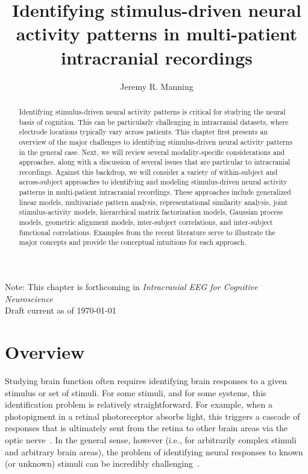 \documentclass{llmxive}
\title{Identifying stimulus-driven neural activity patterns in multi-patient intracranial recordings}
\author{Jeremy R. Manning}
\providecommand{\thesection}{41.\arabic{section}}
\begin{document}
\maketitle
\begin{abstract}
Identifying stimulus-driven neural activity patterns is critical for
  studying the neural basis of cognition. This can be particularly
  challenging in intracranial datasets, where electrode locations
  typically vary across patients. This chapter first presents an
  overview of the major challenges to identifying stimulus-driven
  neural activity patterns in the general case.  Next, we will review
  several modality-specific considerations and approaches, along with
  a discussion of several issues that are particular to intracranial
  recordings.  Against this backdrop, we will consider a variety of
  within-subject and across-subject approaches to identifying and
  modeling stimulus-driven neural activity patterns in multi-patient
  intracranial recordings.  These approaches include generalized
  linear models, multivariate pattern analysis, representational similarity analysis, joint
  stimulus-activity models, hierarchical matrix factorization models,
  Gaussian process models, geometric alignment models, inter-subject
  correlations, and inter-subject functional correlations.  Examples
  from the recent literature serve to illustrate the major concepts
  and provide the conceptual intuitions for each approach.
\end{abstract}
\begin{center}
Note: This chapter is forthcoming in \textit{Intracranial EEG for Cognitive Neuroscience}\\
Draft current as of \today
\end{center}



\renewcommand{\thesection}{41.\arabic{section}}

\section{Overview}
Studying brain function often requires identifying brain responses to
a given stimulus or set of stimuli.  For some stimuli, and for some
systems, this identification problem is relatively straightforward.
For example, when a photopigment in a retinal photoreceptor absorbs
light, this triggers a cascade of responses that is ultimately sent
from the retina to other brain areas via the optic
nerve~\citep{Jaco21}.  In the general sense, however (i.e., for
arbitrarily complex stimuli and arbitrary brain areas), the problem of
identifying neural responses to known (or unknown) stimuli can be
incredibly challenging~\citep{JonaKord17}.
\end{document}
